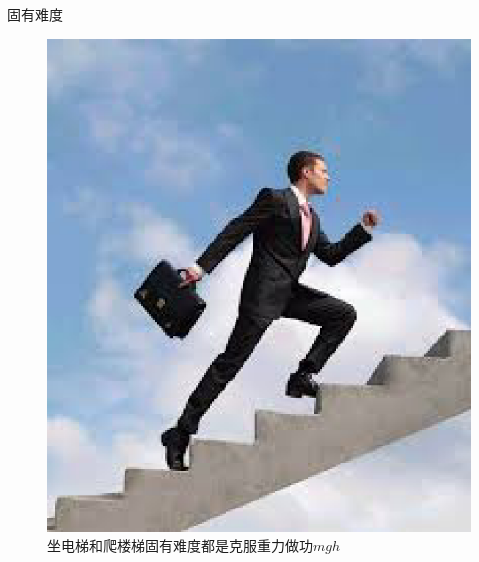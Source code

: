 \documentclass{beamer}
\begin{document}
\begin{frame}{固有难度}
\begin{figure}
\begin{minipage}{0.4\textwidth}
			\includegraphics[height=4\baselineskip]{figures/pl.eps}
		\end{minipage}
		\caption*{\tiny 坐电梯和爬楼梯固有难度都是克服重力做功$mgh$}
	\end{figure}
\end{frame}
\end{document}
